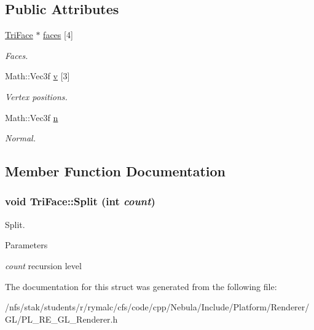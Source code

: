 \subsection*{Public Attributes}
\begin{DoxyCompactItemize}
\item 
\hypertarget{structTriFace_ab77e6b91c5def1e12f70af54cd2eb2f2}{
\hyperlink{structTriFace}{TriFace} $\ast$ \hyperlink{structTriFace_ab77e6b91c5def1e12f70af54cd2eb2f2}{faces} \mbox{[}4\mbox{]}}
\label{structTriFace_ab77e6b91c5def1e12f70af54cd2eb2f2}

\begin{DoxyCompactList}\small\item\em Faces. \item\end{DoxyCompactList}\item 
\hypertarget{structTriFace_a1c06e70bcb0b486c87cb1dc610a5d9fa}{
Math::Vec3f \hyperlink{structTriFace_a1c06e70bcb0b486c87cb1dc610a5d9fa}{v} \mbox{[}3\mbox{]}}
\label{structTriFace_a1c06e70bcb0b486c87cb1dc610a5d9fa}

\begin{DoxyCompactList}\small\item\em Vertex positions. \item\end{DoxyCompactList}\item 
\hypertarget{structTriFace_ad82684033bf5a0c3481594603300ec8e}{
Math::Vec3f \hyperlink{structTriFace_ad82684033bf5a0c3481594603300ec8e}{n}}
\label{structTriFace_ad82684033bf5a0c3481594603300ec8e}

\begin{DoxyCompactList}\small\item\em Normal. \item\end{DoxyCompactList}\end{DoxyCompactItemize}


\subsection{Member Function Documentation}
\hypertarget{structTriFace_adab6763fcdf11d4f7d7974fa8931801b}{
\subsubsection[{Split}]{\setlength{\rightskip}{0pt plus 5cm}void TriFace::Split (int {\em count})}}
\label{structTriFace_adab6763fcdf11d4f7d7974fa8931801b}


Split. 
\begin{DoxyParams}{Parameters}
\item[{\em count}]recursion level \end{DoxyParams}


The documentation for this struct was generated from the following file:\begin{DoxyCompactItemize}
\item 
/nfs/stak/students/r/rymalc/cfs/code/cpp/Nebula/Include/Platform/Renderer/GL/PL\_\-RE\_\-GL\_\-Renderer.h\end{DoxyCompactItemize}
